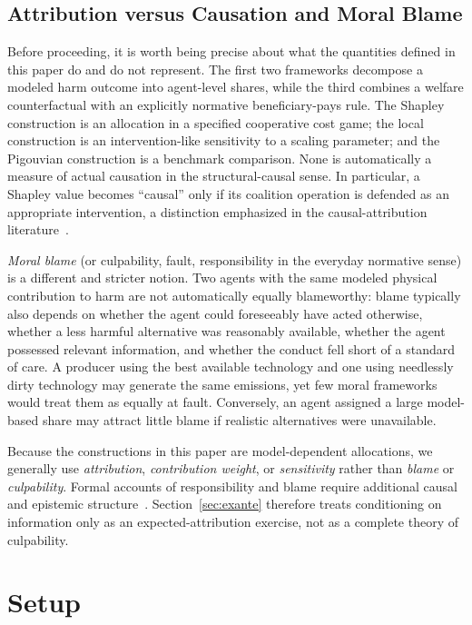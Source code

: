 \documentclass[journal, a4paper]{IEEEtran}
\begin{document}
\subsection{Attribution versus Causation and Moral Blame}
\label{sec:contribution_vs_blame}
Before proceeding, it is worth being precise about what the quantities defined in this paper do and do not represent. The first two frameworks decompose a modeled harm outcome into agent-level shares, while the third combines a welfare counterfactual with an explicitly normative beneficiary-pays rule. The Shapley construction is an allocation in a specified cooperative cost game; the local construction is an intervention-like sensitivity to a scaling parameter; and the Pigouvian construction is a benchmark comparison. None is automatically a measure of actual causation in the structural-causal sense. In particular, a Shapley value becomes ``causal'' only if its coalition operation is defended as an appropriate intervention, a distinction emphasized in the causal-attribution literature~\cite{HalpernPearl2005,HeskesEtAl2020}.

\emph{Moral blame} (or culpability, fault, responsibility in the everyday normative sense) is a different and stricter notion. Two agents with the same modeled physical contribution to harm are not automatically equally blameworthy: blame typically also depends on whether the agent could foreseeably have acted otherwise, whether a less harmful alternative was reasonably available, whether the agent possessed relevant information, and whether the conduct fell short of a standard of care. A producer using the best available technology and one using needlessly dirty technology may generate the same emissions, yet few moral frameworks would treat them as equally at fault. Conversely, an agent assigned a large model-based share may attract little blame if realistic alternatives were unavailable.

Because the constructions in this paper are model-dependent allocations, we generally use \emph{attribution}, \emph{contribution weight}, or \emph{sensitivity} rather than \emph{blame} or \emph{culpability}. Formal accounts of responsibility and blame require additional causal and epistemic structure~\cite{ChocklerHalpern2004}. Section~\ref{sec:exante} therefore treats conditioning on information only as an expected-attribution exercise, not as a complete theory of culpability.

\section{Setup}
\end{document}
